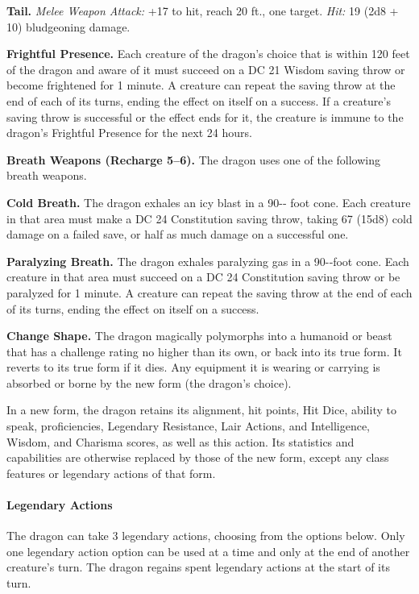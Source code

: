 \documentclass[
]{article}
\begin{document}
\textbf{Tail.} \emph{Melee Weapon Attack:} +17 to hit, reach 20 ft., one
target. \emph{Hit:} 19 (2d8 + 10) bludgeoning damage.

\textbf{Frightful Presence.} Each creature of the dragon's choice that
is within 120 feet of the dragon and aware of it must succeed on a DC 21
Wisdom saving throw or become frightened for 1 minute. A creature can
repeat the saving throw at the end of each of its turns, ending the
effect on itself on a success. If a creature's saving throw is
successful or the effect ends for it, the creature is immune to the
dragon's Frightful Presence for the next 24 hours.

\textbf{Breath Weapons (Recharge 5--6).} The dragon uses one of the
following breath weapons.

\textbf{Cold Breath.} The dragon exhales an icy blast in a 90-­‐ foot
cone. Each creature in that area must make a DC 24 Constitution saving
throw, taking 67 (15d8) cold damage on a failed save, or half as much
damage on a successful one.

\textbf{Paralyzing Breath.} The dragon exhales paralyzing gas in a
90-­‐foot cone. Each creature in that area must succeed on a DC 24
Constitution saving throw or be paralyzed for 1 minute. A creature can
repeat the saving throw at the end of each of its turns, ending the
effect on itself on a success.

\textbf{Change Shape.} The dragon magically polymorphs into a humanoid
or beast that has a challenge rating no higher than its own, or back
into its true form. It reverts to its true form if it dies. Any
equipment it is wearing or carrying is absorbed or borne by the new form
(the dragon's choice).

In a new form, the dragon retains its alignment, hit points, Hit Dice,
ability to speak, proficiencies, Legendary Resistance, Lair Actions, and
Intelligence, Wisdom, and Charisma scores, as well as this action. Its
statistics and capabilities are otherwise replaced by those of the new
form, except any class features or legendary actions of that form.

\hypertarget{legendary-actions-18}{%
\paragraph{Legendary Actions}\label{legendary-actions-18}}

The dragon can take 3 legendary actions, choosing from the options
below. Only one legendary action option can be used at a time and only
at the end of another creature's turn. The dragon regains spent
legendary actions at the start of its turn.
\end{document}
